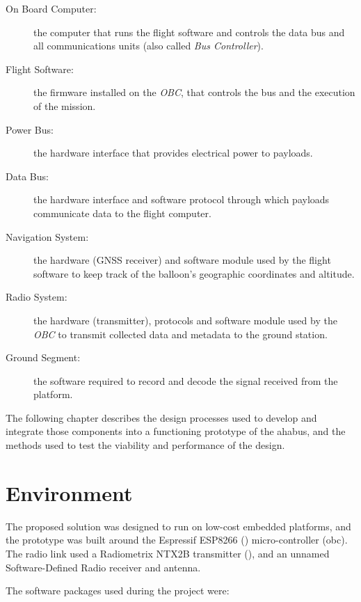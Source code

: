 \begin{description}
    
\item[On Board Computer:] the computer that runs the flight software and
controls the data bus and all communications units (also called
\textit{Bus Controller}).

\item[Flight Software:] the firmware installed on the \textit{OBC}, that
controls the bus and the execution of the mission.

\item[Power Bus:] the hardware interface that provides electrical power to
payloads.

\item[Data Bus:] the hardware interface and software protocol through which
payloads communicate data to the flight computer.

\item[Navigation System:] the hardware (GNSS receiver) and software module used
by the flight software to keep track of the balloon's geographic coordinates and
altitude.

\item[Radio System:] the hardware (transmitter), protocols and software module
used by the \textit{OBC} to transmit collected data and metadata to the
ground station.

\item[Ground Segment:] the software required to record and decode the signal
received from the platform.
    
\end{description}

The following chapter describes the design processes used to develop and
integrate those components into a functioning prototype of the
\acrfull{ahabus}, and the methods used to test the viability and performance of
the design.

\section{Environment}

The proposed solution was designed to run on low-cost embedded platforms, and the prototype was built around the Espressif ESP8266 (\cite{EspressifInc.2017}) micro-controller (\acrlong{obc}). The radio link used a Radiometrix NTX2B transmitter (\cite{radiometrix2012}), and an unnamed Software-Defined Radio receiver and antenna.

The software packages used during the project were:

